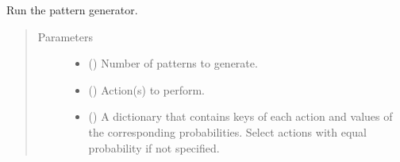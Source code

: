\documentclass[letterpaper,10pt,english]{sphinxmanual}
\begin{document}
\begin{fulllineitems}
\begin{quote}
\begin{description}
\begin{itemize}
\end{itemize}

\end{description}\end{quote}

\begin{fulllineitems}
\label{\detokenize{build:acat.build.patterns.StochasticPatternGenerator.run}}
Run the pattern generator.
\begin{quote}\begin{description}
\item[{Parameters}] \leavevmode\begin{itemize}
\item {} 
 () \textendash{} Number of patterns to generate.

\item {} 
 (\sphinxstyleliteralemphasis{\sphinxupquote{, }}\sphinxstyleliteralemphasis{\sphinxupquote{ {[}}}\sphinxstyleliteralemphasis{\sphinxupquote{, }}\sphinxstyleliteralemphasis{\sphinxupquote{, }}\sphinxstyleliteralemphasis{\sphinxupquote{{]}}}) \textendash{} Action(s) to perform.

\item {} 
 (\sphinxstyleliteralemphasis{\sphinxupquote{, }}) \textendash{} A dictionary that contains keys of each action and values of the
corresponding probabilities. Select actions with equal probability
if not specified.


\end{itemize}
\end{description}
\end{quote}
\end{fulllineitems}
\end{fulllineitems}
\end{document}
